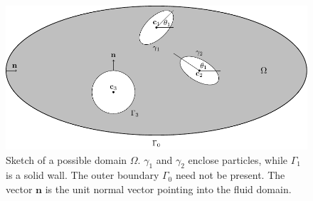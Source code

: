 \documentclass[preprint, 10pt]{elsarticle}
\begin{document}
\begin{figure}[!h]
\begin{center}
\includegraphics{figures/multiply_connected.pdf}
\end{center}
\caption{\label{fig:geomSchematic}Sketch of a possible domain $\Omega$.
  $\gamma_1$ and $\gamma_2$ enclose particles, while $\Gamma_1$ is a
  solid wall. The outer boundary $\Gamma_0$ need not be present.  The
  vector $\mathbf{n}$ is the unit normal vector pointing into the fluid
  domain.}
\end{figure}

\end{document}
